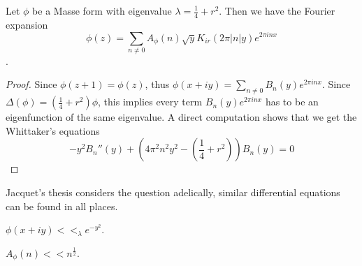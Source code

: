 \documentclass[../main.tex]{subfiles}
\begin{document}
\begin{theorem}
Let $\phi$ be a Masse form with eigenvalue $\lambda = \frac{1}{4}+r^{2}$. Then we have the Fourier expansion
$$\phi(z)=\sum_{n\neq 0}A_{\phi}(n)\sqrt{y}K_{ir}(2\pi |n|y)e^{2\pi i nx}$$.
\end{theorem}
\begin{proof}
Since $\phi(z+1)=\phi(z)$, thus $\phi(x+iy)=\displaystyle \sum_{n\neq 0}B_{n}(y)e^{2\pi i nx}$. Since $\Delta(\phi)=(\frac{1}{4}+r^2)\phi$, this implies every term $B_{n}(y)e^{2\pi i nx}$ has to be an eigenfunction of the same eigenvalue. A direct computation shows that we get the Whittaker's equations  
$$-y^{2}B_{n}''(y)+(4\pi^{2}n^{2}y^{2}-(\frac{1}{4}+r^{2}))B_{n}(y)=0$$
\end{proof}
\begin{remark}
Jacquet's thesis considers the question adelically, similar differential equations can be found in all places. 
\end{remark}


\begin{corollary}
$\phi(x+iy)<<_{\lambda}e^{-y^{2}}$.
\end{corollary}
\begin{lemma}
$A_{\phi}(n)<<n^{\frac{1}{2}}$.
\end{lemma}
\end{document}
